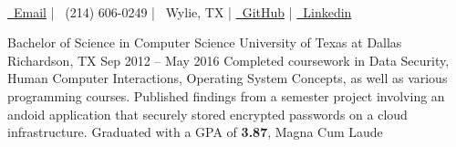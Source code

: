 \documentclass[]{awesome-cv}
\begin{document}
    
\begin{center}
	 \\
	\vspace{2mm}
	\href {mailto:laluvjohn@gmail.com} {\faEnvelope\ Email} | {\faMobile\ (214) 606-0249} | {\faMapMarker\ Wylie, TX} |  \href {https://github.com/laluvjohntx} {\faGithubSquare\ GitHub} |  \href {https://www.linkedin.com/in/lalu-john-9957438b/} {\faLinkedinSquare\ Linkedin}
\end{center}
\begin{cventries}
	\cventry
	{Bachelor of Science in Computer Science}
	{University of Texas at Dallas}
	{Richardson, TX}
	{Sep 2012 – May 2016}
	{Completed coursework in Data Security, Human Computer Interactions, Operating System Concepts, as well as various programming courses. Published findings from a semester project involving an andoid application that securely stored encrypted passwords on a cloud infrastructure. \newline
    	Graduated with a GPA of \textbf{3.87}, Magna Cum Laude}
\end{cventries}
\end{document}

